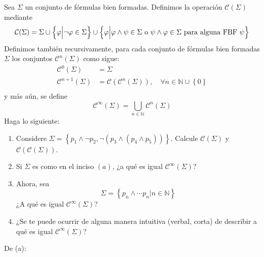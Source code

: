 \documentclass[12pt]{report}
\newcounter{it}
\theoremstyle{largebreak}
\begin{document}
    \begin{excer}
        Sea $\Sigma$ un conjunto de fórmulas bien formadas. Definimos la operación $\mathcal{C}(\Sigma)$ mediante
        \begin{equation*}
            \mathcal{C}(\Sigma)=\Sigma\cup\left\{\varphi\Big|\neg\varphi\in\Sigma \right\}\cup\left\{\varphi\Big|\varphi\land\psi\in\Sigma\textup{ o }\psi\land\varphi\in\Sigma\textup{ para alguna FBF }\psi \right\}
        \end{equation*}
        Definimos también recursivamente, para cada conjunto de fórmulas bien formadas $\Sigma$ los conjuntos $\mathcal{C}^n(\Sigma)$ como sigue:
        \begin{equation*}
            \begin{split}
                \mathcal{C}^0(\Sigma)&=\Sigma\\
                \mathcal{C}^{n+1}(\Sigma)&=\mathcal{C}(\mathcal{C}^n(\Sigma)),\quad\forall n\in\mathbb{N}\cup\left\{0\right\}\\
            \end{split}
        \end{equation*}
        y más aún, se define
        \begin{equation*}
            \mathcal{C}^\infty(\Sigma)=\bigcup_{ n\in\mathbb{N}}\mathcal{C}^n(\Sigma)
        \end{equation*}
        Haga lo siguiente:
        \begin{enumerate}
            \item Considere $\Sigma=\left\{p_1\land\neg p_2,\neg(p_3\land(p_4\land p_5)) \right\}$. Calcule $\mathcal{C}(\Sigma)$ y $\mathcal{C}(\mathcal{C}(\Sigma))$.
            \item Si $\Sigma$ es como en el inciso $(a)$, ¿a qué es igual $\mathcal{C}^\infty(\Sigma)$?
            \item Ahora, sea
            \begin{equation*}
                \Sigma=\left\{p_n\land\cdots p_n\Big|n\in\mathbb{N} \right\}
            \end{equation*}
            ¿A qué es igual $\mathcal{C}^\infty(\Sigma)$?
            \item ¿Se te puede ocurrir de alguna manera intuitiva (verbal, corta) de describir a qué es igual $\mathcal{C}^\infty(\Sigma)$?
        \end{enumerate}
    \end{excer}
    
    \begin{sol}
        De (a): %
    \end{sol}
\end{document}

